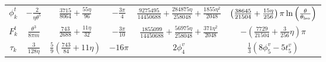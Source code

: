 \begin {table}[h]
\begin {center}
\begin {tabular}{cccccc}
$\phi^t_k$
      & $-\frac{2}{\eta \theta^5}$
      & $\frac{3715}{8064}+\frac{55\eta}{96}$
      & $-\frac{3\pi}{4}$
      & $\frac{9275495}{14450688}+\frac{284875\eta}{258048 } +
\frac{1855\eta^2}{2048 }$
      & $\left (\frac {38645}{21504} + \frac{15\eta}{256 } \right ) \pi
\ln \left ( \frac {\theta}{\theta_{\rm lso}} \right ) $\\[3pt]
$F^t_k$
      & $\frac{\theta^3}{8\pi m}$
      & $\frac{743}{2688}+\frac{11\eta}{32}$
      & $-\frac{3\pi}{10}$
       & $\frac {1855099}{14450688} + \frac{56975\eta}{258048 } +
\frac{371\eta^2}{2048 }$
      & $- \left(\frac{7729}{21504} + \frac{3}{256}\eta\right)\pi$\\[3pt]
$\tau_k$
      & $\frac{3}{128\eta}$
      & $ \frac{5}{9}
        \left ( \frac{743}{84} + 11\eta\right )$
      & $-16\pi $
      & $2  \phi^v_4$
      & $ \frac{1}{3} \left ( 8 \phi^v_5 - 5 t^v_5 \right ) $\\
      \hline
\end {tabular}
\end {center}
\label{table:flux}
\end {table}

